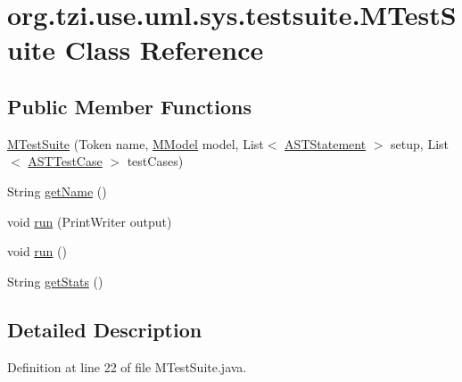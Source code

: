 \hypertarget{classorg_1_1tzi_1_1use_1_1uml_1_1sys_1_1testsuite_1_1_m_test_suite}{\section{org.\-tzi.\-use.\-uml.\-sys.\-testsuite.\-M\-Test\-Suite Class Reference}
\label{classorg_1_1tzi_1_1use_1_1uml_1_1sys_1_1testsuite_1_1_m_test_suite}
}
\subsection*{Public Member Functions}
\begin{DoxyCompactItemize}
\item 
\hyperlink{classorg_1_1tzi_1_1use_1_1uml_1_1sys_1_1testsuite_1_1_m_test_suite_a3e50cd0ba8980c5e75b6f8f3c10c204c}{M\-Test\-Suite} (Token name, \hyperlink{classorg_1_1tzi_1_1use_1_1uml_1_1mm_1_1_m_model}{M\-Model} model, List$<$ \hyperlink{classorg_1_1tzi_1_1use_1_1parser_1_1soil_1_1ast_1_1_a_s_t_statement}{A\-S\-T\-Statement} $>$ setup, List$<$ \hyperlink{classorg_1_1tzi_1_1use_1_1parser_1_1testsuite_1_1_a_s_t_test_case}{A\-S\-T\-Test\-Case} $>$ test\-Cases)
\item 
String \hyperlink{classorg_1_1tzi_1_1use_1_1uml_1_1sys_1_1testsuite_1_1_m_test_suite_a627113ec9dd12b9ab46e23d26b685382}{get\-Name} ()
\item 
void \hyperlink{classorg_1_1tzi_1_1use_1_1uml_1_1sys_1_1testsuite_1_1_m_test_suite_a6e9bc73ecec7f546d0dda85febfd3b65}{run} (Print\-Writer output)
\item 
void \hyperlink{classorg_1_1tzi_1_1use_1_1uml_1_1sys_1_1testsuite_1_1_m_test_suite_a153a915bcae41993fec513dd1d5a2e66}{run} ()
\item 
String \hyperlink{classorg_1_1tzi_1_1use_1_1uml_1_1sys_1_1testsuite_1_1_m_test_suite_afc08599e1f17a2aa02de9cb908754268}{get\-Stats} ()
\end{DoxyCompactItemize}


\subsection{Detailed Description}


Definition at line 22 of file M\-Test\-Suite.\-java.



